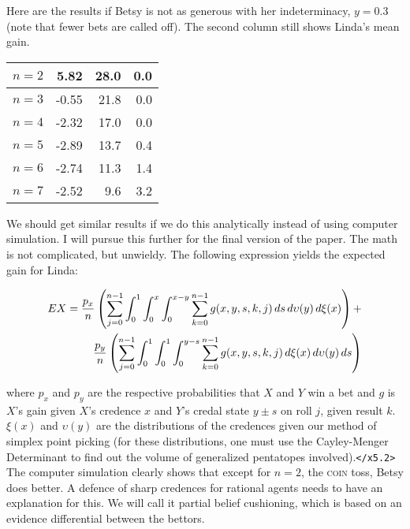 \documentclass[11pt]{article}
\begin{document}
Here are the results if Betsy is not as generous with her indeterminacy, $y=0.3$ (note that fewer bets are called off). The second column still shows Linda's mean gain.

\begin{tabular}{|l|r|r|r|}
  \hline
  $n=2$ & 5.82 & 28.0 & 0.0 \\ \hline
  $n=3$ & -0.55 & 21.8 & 0.0 \\ \hline
  $n=4$ & -2.32 & 17.0 & 0.0 \\ \hline
  $n=5$ & -2.89 & 13.7 & 0.4 \\ \hline
  $n=6$ & -2.74 & 11.3 & 1.4 \\ \hline
  $n=7$ & -2.52 & 9.6 & 3.2 \\ \hline
\end{tabular}

We should get similar results if we do this analytically instead of using computer simulation. I will pursue this further for the final version of the paper. The math is not complicated, but unwieldy. The following expression yields the expected gain for Linda:

\begin{eqnarray}
  \label{eq:s3}
  EX =
  \frac{p_{x}}{n}\left(\sum_{j=0}^{n-1}\int_{0}^{1}\int_{0}^{x}\int_{0}^{x-y}\sum_{k=0}^{n-1}g(x,y,s,k,j)\,ds\,d\upsilon(y)\,d\xi(x)\right)+
  \notag \\
  \frac{p_{y}}{n}\left(\sum_{j=0}^{n-1}\int_{0}^{1}\int_{0}^{1}\int_{0}^{y-s}\sum_{k=0}^{n-1}g(x,y,s,k,j)\,d\xi(x)\,d\upsilon(y)\,ds\right)
\end{eqnarray}

where $p_{x}$ and $p_{y}$ are the respective probabilities that $X$ and $Y$ win a bet and $g$ is $X$'s gain given $X$'s credence $x$ and $Y$'s credal state $y\pm{}s$ on roll $j$, given result $k$. $\xi(x)$ and $\upsilon(y)$ are the distributions of the credences given our method of simplex point picking (for these distributions, one must use the Cayley-Menger Determinant to find out the volume of generalized pentatopes involved).\texttt{</x5.2>} The computer simulation clearly shows that except for $n=2$, the \textsc{coin} toss, Betsy does better. A defence of sharp credences for rational agents needs to have an explanation for this. We will call it partial belief cushioning, which is based on an evidence differential between the bettors.
\end{document}
